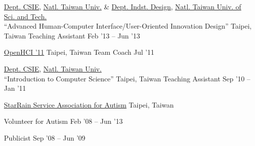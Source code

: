 \documentclass[10pt, a4paper]{article} %
\begin{document}

\spacedhrule{1.5em}{-1em} %




\headedsection
{
 \href{http://www.csie.ntu.edu.tw}{Dept. CSIE},
 \href{http://www.ntu.edu.tw}{Natl. Taiwan Univ.} \&
 \href{http://www.dt.ntust.edu.tw/}{Dept. Indst. Design},
 \href{http://www.ntust.edu.tw}{Natl. Taiwan Univ. of Sci. and Tech.}\\
 ``Advanced Human-Computer Interface/User-Oriented Innovation Design''
}
{Taipei, Taiwan}{
	\headedsubsection
	{Teaching Assistant}
	{Feb '13 -- Jun '13}
	{
	}
}

\headedsection
{
 \href{http://www.opehci.com/2011/}{OpenHCI '11}
}
{Taipei, Taiwan}{
	\headedsubsection
	{Team Coach}
	{Jul '11}
	{
	}
}

\headedsection
{
 \href{http://www.csie.ntu.edu.tw}{Dept. CSIE},
 \href{http://www.ntu.edu.tw}{Natl. Taiwan Univ.}\\
 ``Introduction to Computer Science''
}
{Taipei, Taiwan}{
	\headedsubsection
	{Teaching Assistant}
	{Sep '10 -- Jan '11}
	{
	}
}


\spacedhrule{1.5em}{-1em} %



\headedsection
{\href{http://goo.gl/2Dmqrj}{StarRain Service Association for Autism}}
{Taipei, Taiwan}{

	\headedsubsection
	{Volunteer for Autism} 
	{Feb '08 -- Jun '13}
	{}

	\headedsubsection
	{Publicist} 
	{Sep '08 -- Jun '09}
	{} 
}
\end{document}
